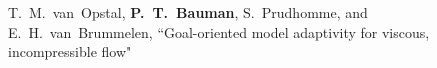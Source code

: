 T.~M.~van~Opstal, \textbf{P.~T.~Bauman}, S.~Prudhomme, and E.~H.~van~Brummelen,
``Goal-oriented model adaptivity for viscous, incompressible flow"



